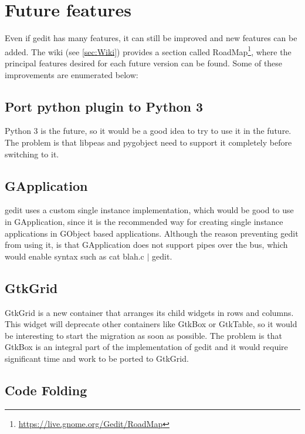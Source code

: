 \chapter{Future features}

Even if gedit has many features, it can still be improved  and new features can be added. The wiki (see \ref{sec:Wiki}) provides a section called RoadMap\footnote{\url{https://live.gnome.org/Gedit/RoadMap}}, where the principal features desired for each future version can be found.  Some of these improvements are enumerated below:

\section{Port python plugin to Python 3}

Python 3 is the future, so it would be a good idea to try to use it in the future. The problem is that libpeas and pygobject need to support it completely before switching to it.

\section{GApplication}

gedit uses a custom single instance implementation, which would be good to use in GApplication, since it is the recommended way for creating single instance applications in GObject based applications. Although the reason preventing gedit from using it, is that GApplication does not support pipes over the bus, which would enable syntax such as cat blah.c $|$ gedit.

\newpage
\section{GtkGrid}

GtkGrid is a new container that arranges its child widgets in rows and columns. This widget will deprecate other containers like GtkBox or GtkTable, so it would be interesting to start the migration as soon as possible. The problem is that GtkBox is an integral part of the  implementation of gedit and it would require significant time and work to be ported to GtkGrid.

\section{Code Folding}

